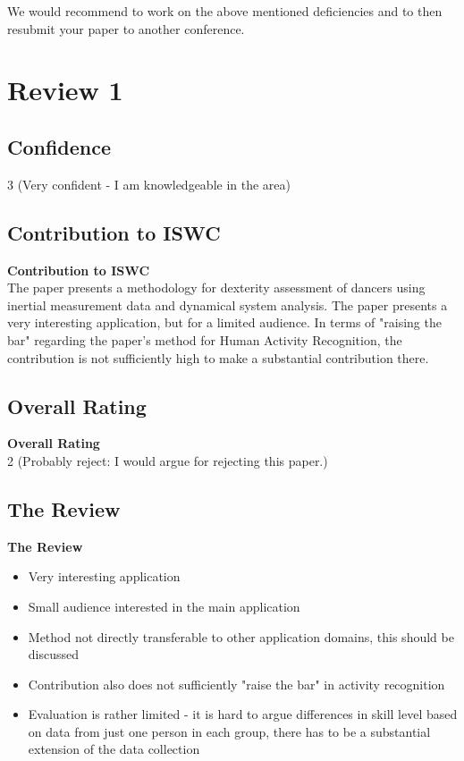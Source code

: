 \documentclass[8pt]{article}
\begin{document}
We would recommend to work on the above mentioned deficiencies and to
then resubmit your paper to another conference.


\section{Review 1}
\subsection{Confidence}
3  (Very confident - I am knowledgeable in the area)
   
\subsection{Contribution to ISWC}
\textbf{Contribution to ISWC} \\
   The paper presents a methodology for dexterity assessment of dancers
   using inertial measurement data and dynamical system analysis. The paper
   presents a very interesting application, but for a limited audience. In
   terms of "raising the bar" regarding the paper's method for Human
   Activity Recognition, the contribution is not sufficiently high to make a
   substantial contribution there.

\subsection{Overall Rating}
\textbf{Overall Rating} \\
2  (Probably reject: I would argue for rejecting this paper.)

\subsection{The Review}
\textbf{The Review}
\begin{itemize}[topsep=0pt,itemsep=-1ex,partopsep=1ex,parsep=1ex]
    \item Very interesting application
    \item Small audience interested in the main application
    \item Method not directly transferable to other application domains, this
   should be discussed
    \item Contribution also does not sufficiently "raise the bar" in activity
   recognition
    \item Evaluation is rather limited - it is hard to argue differences in skill
   level based on data from just one person in each group, there has to be a
   substantial extension of the data collection
   \end{itemize}
\end{document}

